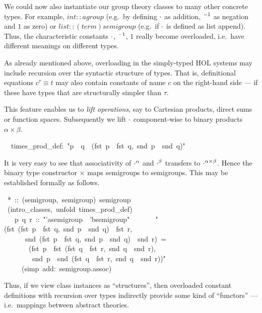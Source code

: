 \begin{isabelle}
\begin{isamarkuptext}
 \medskip We could now also instantiate our group theory classes to
 many other concrete types.  For example, $int :: agroup$ (e.g.\ by
 defining $\cdot$ as addition, $\emph{${}^{-1}$}$ as negation and $1$ as
 zero) or $list :: (term)semigroup$ (e.g.\ if $\cdot$ is defined as
 list append).  Thus, the characteristic constants $\cdot$,
 $\emph{${}^{-1}$}$, $1$ really become overloaded, i.e.\ have different
 meanings on different types.%
\end{isamarkuptext}%
%
%
\begin{isamarkuptext}%
As already mentioned above, overloading in the simply-typed HOL
 systems may include recursion over the syntactic structure of types.
 That is, definitional equations $c^\tau \equiv t$ may also contain
 constants of name $c$ on the right-hand side --- if these have types
 that are structurally simpler than $\tau$.

 This feature enables us to \emph{lift operations}, say to Cartesian
 products, direct sums or function spaces.  Subsequently we lift
 $\cdot$ component-wise to binary products $\alpha \times \beta$.%
\end{isamarkuptext}%
\isanewline
~~times\_prod\_def:~{"}p~{\isasymOtimes}~q~{\isasymequiv}~(fst~p~{\isasymOtimes}~fst~q,~snd~p~{\isasymOtimes}~snd~q){"}%
\begin{isamarkuptext}%
It is very easy to see that associativity of $\cdot^\alpha$ and
 $\cdot^\beta$ transfers to ${\cdot}^{\alpha \times \beta}$.  Hence
 the binary type constructor $\times$ maps semigroups to semigroups.
 This may be established formally as follows.%
\end{isamarkuptext}%
~*~::~(semigroup,~semigroup)~semigroup\isanewline
{}~(intro\_classes,~unfold~times\_prod\_def)\isanewline
~~~p~q~r~::~{"}'a{\isasymColon}semigroup~{\isasymtimes}~'b{\isasymColon}semigroup{"}\isanewline
~~\isanewline
~~~~{"}(fst~(fst~p~{\isasymOtimes}~fst~q,~snd~p~{\isasymOtimes}~snd~q)~{\isasymOtimes}~fst~r,\isanewline
~~~~~~snd~(fst~p~{\isasymOtimes}~fst~q,~snd~p~{\isasymOtimes}~snd~q)~{\isasymOtimes}~snd~r)~=\isanewline
~~~~~~~(fst~p~{\isasymOtimes}~fst~(fst~q~{\isasymOtimes}~fst~r,~snd~q~{\isasymOtimes}~snd~r),\isanewline
~~~~~~~~snd~p~{\isasymOtimes}~snd~(fst~q~{\isasymOtimes}~fst~r,~snd~q~{\isasymOtimes}~snd~r)){"}\isanewline
~~~~~(simp~add:~semigroup.assoc)\isanewline
{}%
\begin{isamarkuptext}%
Thus, if we view class instances as ``structures'', then overloaded
 constant definitions with recursion over types indirectly provide
 some kind of ``functors'' --- i.e.\ mappings between abstract
 theories.%
\end{isamarkuptext}%
\end{isabelle}%
